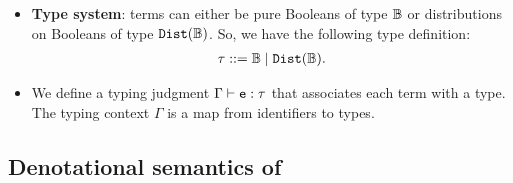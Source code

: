 \documentclass{tufte-handout}
\begin{document}
\begin{itemize}
\item \textbf{Type system}: terms can either be pure Booleans of type $\mathbb{B}$ 
or distributions on Booleans of type $\mathtt{Dist}(\mathbb{B})$. So, we have the following 
type definition:
\begin{align}
  \tau ::= \mathbb{B} \mid \mathtt{Dist}(\mathbb{B}).
\end{align}

\item We define a typing judgment $\Gamma \vdash \texttt{e} : \tau$ that associates each 
term with a type. The typing context $\Gamma$ is a map from identifiers to types.

\end{itemize}



\subsection{Denotational semantics of \disc{}}
\end{document}

